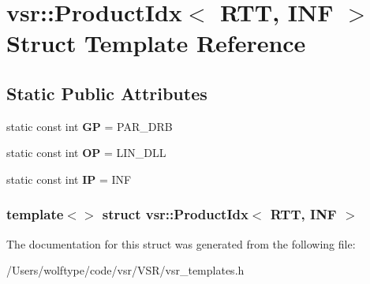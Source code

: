 \hypertarget{structvsr_1_1_product_idx_3_01_r_t_t_00_01_i_n_f_01_4}{\section{vsr\-:\-:Product\-Idx$<$ R\-T\-T, I\-N\-F $>$ Struct Template Reference}
\label{structvsr_1_1_product_idx_3_01_r_t_t_00_01_i_n_f_01_4}
}
\subsection*{Static Public Attributes}
\begin{DoxyCompactItemize}
\item 
\hypertarget{structvsr_1_1_product_idx_3_01_r_t_t_00_01_i_n_f_01_4_aa629a4c17834c2425c63fb810ea382e3}{static const int {\bfseries G\-P} = P\-A\-R\-\_\-\-D\-R\-B}\label{structvsr_1_1_product_idx_3_01_r_t_t_00_01_i_n_f_01_4_aa629a4c17834c2425c63fb810ea382e3}

\item 
\hypertarget{structvsr_1_1_product_idx_3_01_r_t_t_00_01_i_n_f_01_4_a066bfabecb0ef5f08559816bbe5c37dd}{static const int {\bfseries O\-P} = L\-I\-N\-\_\-\-D\-L\-L}\label{structvsr_1_1_product_idx_3_01_r_t_t_00_01_i_n_f_01_4_a066bfabecb0ef5f08559816bbe5c37dd}

\item 
\hypertarget{structvsr_1_1_product_idx_3_01_r_t_t_00_01_i_n_f_01_4_ab87fd6204999587af68c9e16d9d4ed1d}{static const int {\bfseries I\-P} = I\-N\-F}\label{structvsr_1_1_product_idx_3_01_r_t_t_00_01_i_n_f_01_4_ab87fd6204999587af68c9e16d9d4ed1d}

\end{DoxyCompactItemize}
\subsubsection*{template$<$$>$ struct vsr\-::\-Product\-Idx$<$ R\-T\-T, I\-N\-F $>$}



The documentation for this struct was generated from the following file\-:\begin{DoxyCompactItemize}
\item 
/\-Users/wolftype/code/vsr/\-V\-S\-R/vsr\-\_\-templates.\-h\end{DoxyCompactItemize}
